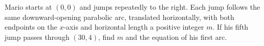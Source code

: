 Mario starts at $(0,0)$ and jumps repeatedly to the right. Each jump follows the same downward-opening parabolic arc, translated horizontally, with both endpoints on the $x$-axis and horizontal length a positive integer $m$. If his fifth jump passes through $(30,4)$, find $m$ and the equation of his first arc.
